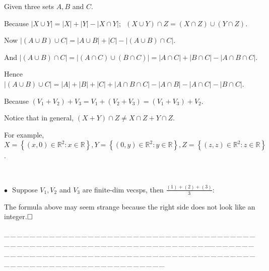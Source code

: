\documentclass[a4paper, 11pt, UTF8]{article}
\def\Rbb{{\mathbb{R}}}
\def\BulletPoint{{\small$\bullet$}}
\def\ProblemEnding{{\tiny \_\,\_\,\_\,\_\,\_\,\_\,\_\,\_\,\_\,\_\,\_\,\_\,\_\,\_\,\_\,\_\,\_\,\_\,\_\,\_\,\_\,\_\,\_\,\_\,\_\,\_\,\_\,\_\,\_\,\_\,\_\,\_\,\_\,\_\,\_\,\_\,\_\,\_\,\_\,\_\,\_\,\_\,\_\,\_\,\_\,\_\,\_\,\_\,\_\,\_\,\_\,\_\,\_\,\_\,\_\,\_\,\_\,\_\,\_\,\_\,\_\,\_\,\_\,\_\,\_\,\_\,\_\,\_\,\_\,\_\,\_\_\,\_\,\_\,\_\,\_\,\_\,\_\,\_\,\_\,\_\,\_\,\_\,\_\,\_\,\_\,\_\,\_\,\_\,\_\,\_\,\_\,\_\,\_\,\_\,\_\,\_\,\_\,\_\,\_\,\_\,\_\,\_\,\_\,\_\,\_\,\_\,\_\,\_\,\_\,\_\,\_\,\_\,\_\,\_\,\_\,\_\,\_\,\_\,\_\,\_\,\_\,\_\,\_\,\_\,\_\,\_\,\_\,\_\,\_\,\_\,\_\,\_\,\_\,\_\,\_\,\_\,\_\,\_\,\_\,\_\,\_}}
\begin{document}
\begin{large}
\par{}\; Given three sets $A,B$ and $C$.\par\quad
Because $\left|X\cup Y\right|=\left|X\right|+\left|Y\right|-\left|X\cap Y\right|;\,\,\,(X\cup Y)\cap Z=(X\cap Z)\cup(Y\cap Z)$.\par\quad
Now $\left|(A\cup B)\cup C\right|=\left|A\cup B\right|+\left|C\right|-\left|(A\cup B)\cap C\right|.$\par\quad
And $\left|(A\cup B)\cap C\right|=\left|(A\cap C)\cup(B\cap C)\right|=\left|A\cap C\right|+\left|B\cap C\right|-\left|A\cap B\cap C\right|.$\par\quad
Hence $\left|(A\cup B)\cup C\right|=\left| A\right|+\left|B\right|+\left|C\right|+\left|A\cap B\cap C\right|-\left| A\cap B\right|-\left| A\cap C\right|-\left| B\cap C\right|.$\par\vspace{12pt}\quad
Because $(V_1+V_2)+V_3=V_1+(V_2+V_3)=(V_1+V_3)+V_2$.\par\quad
{}\par\quad
Notice that in general, $(X+Y)\cap Z\neq X\cap Z+Y\cap Z$.\par\quad
For example, $X=\left\{(x,0)\in\Rbb^2:x\in\Rbb\right\},Y=\left\{(0,y)\in\Rbb^2:y\in\Rbb\right\},Z=\left\{(z,z)\in\Rbb^2:z\in\Rbb\right\}$.\par
{\,}\par
\BulletPoint \,\Corollary \,\,\,{\timessl\Large Suppose $V_1,V_2$ and $V_3$ are finite-dim vecsps, then} {\small $\displaystyle\frac{(1)+(2)+(3)}{3}:$
}\par
{}\par\quad
{\timessl The formula above may seem strange because the right side does not look like an integer.$\hfill\square$}\par
\ProblemEnding\vspace{10pt}\par


\end{large}
\end{document}
